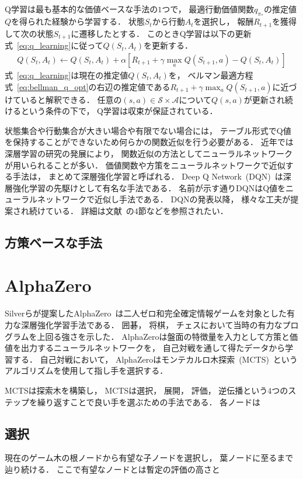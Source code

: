 Q学習は最も基本的な価値ベースな手法の$1$つで， 最適行動価値関数$q_{\pi_*}$の推定値$Q$を得られた経験から学習する．
状態$S_t$から行動$A_t$を選択し， 報酬$R_{t+1}$を獲得して次の状態$S_{t+1}$に遷移したとする．
このときQ学習は以下の更新式~\ref{eq:q_learning}に従って$Q(S_t, A_t)$を更新する．
\begin{align}
  \label{eq:q_learning}
  Q(S_t, A_t) \leftarrow Q(S_t, A_t) + \alpha [R_{t+1} + \gamma \max_a Q(S_{t+1}, a) - Q(S_t, A_t)] 
\end{align}
式~\ref{eq:q_learning}は現在の推定値$Q(S_t, A_t)$を， ベルマン最適方程式~\ref{eq:bellman_q_opt}の右辺の推定値である$R_{t+1} + \gamma \max_a Q(S_{t+1}, a)$に近づけていると解釈できる．
任意の$(s, a) \in \mathcal{S} \times \mathcal{A}$について$Q(s,a)$が更新され続けるという条件の下で， Q学習は収束が保証されている．

状態集合や行動集合が大きい場合や有限でない場合には， テーブル形式でQ値を保持することができないため何らかの関数近似を行う必要がある．
近年では深層学習の研究の発展により， 関数近似の方法としてニューラルネットワークが用いられることが多い．
価値関数や方策をニューラルネットワークで近似する手法は， まとめて深層強化学習と呼ばれる．
Deep Q Network~(DQN)~\cite{DQN}は深層強化学習の先駆けとして有名な手法である． 
名前が示す通りDQNはQ値をニューラルネットワークで近似し手法である．
DQNの発表以降， 様々な工夫が提案され続けている．
詳細は文献~\cite{deepRL}の$4$節などを参照されたい．

\subsection{方策ベースな手法}

\section{AlphaZero}
Silverらが提案したAlphaZero~\cite{AlphaZero}は二人ゼロ和完全確定情報ゲームを対象とした有力な深層強化学習手法である．
囲碁， 将棋， チェスにおいて当時の有力なプログラムを上回る強さを示した．
AlphaZeroは盤面の特徴量を入力として方策と価値を出力するニューラルネットワークを， 自己対戦を通して得たデータから学習する．
自己対戦において， AlphaZeroはモンテカルロ木探索~(MCTS)~というアルゴリズムを使用して指し手を選択する．

MCTSは探索木を構築し， 
MCTSは選択， 展開， 評価， 逆伝播という$4$つのステップを繰り返すことで良い手を選ぶための手法である．
各ノードは

\subsection*{選択}
現在のゲーム木の根ノードから有望な子ノードを選択し， 葉ノードに至るまで辿り続ける．
ここで有望なノードとは暫定の評価の高さと
